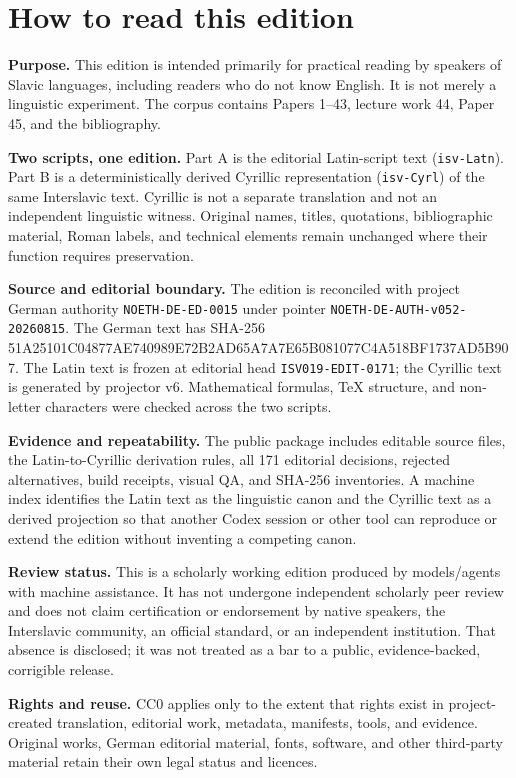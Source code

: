 \documentclass[11pt]{article}
\newcommand{\smallhash}[1]{{\ttfamily\footnotesize #1}}
\begin{document}
\section*{How to read this edition}

\textbf{Purpose.} This edition is intended primarily for practical reading by speakers of Slavic languages, including readers who do not know English. It is not merely a linguistic experiment. The corpus contains Papers 1--43, lecture work 44, Paper 45, and the bibliography.

\textbf{Two scripts, one edition.} Part A is the editorial Latin-script text (\texttt{isv-Latn}). Part B is a deterministically derived Cyrillic representation (\texttt{isv-Cyrl}) of the same Interslavic text. Cyrillic is not a separate translation and not an independent linguistic witness. Original names, titles, quotations, bibliographic material, Roman labels, and technical elements remain unchanged where their function requires preservation.

\textbf{Source and editorial boundary.} The edition is reconciled with project German authority \texttt{NOETH-DE-ED-0015} under pointer \texttt{NOETH-DE-AUTH-v052-20260815}. The German text has SHA-256
\smallhash{51A25101C04877AE740989E72B2AD65A7A7E65B081077C4A518BF1737AD5B907}.
The Latin text is frozen at editorial head \texttt{ISV019-EDIT-0171}; the Cyrillic text is generated by projector v6. Mathematical formulas, TeX structure, and non-letter characters were checked across the two scripts.

\textbf{Evidence and repeatability.} The public package includes editable source files, the Latin-to-Cyrillic derivation rules, all 171 editorial decisions, rejected alternatives, build receipts, visual QA, and SHA-256 inventories. A machine index identifies the Latin text as the linguistic canon and the Cyrillic text as a derived projection so that another Codex session or other tool can reproduce or extend the edition without inventing a competing canon.

\textbf{Review status.} This is a scholarly working edition produced by models/agents with machine assistance. It has not undergone independent scholarly peer review and does not claim certification or endorsement by native speakers, the Interslavic community, an official standard, or an independent institution. That absence is disclosed; it was not treated as a bar to a public, evidence-backed, corrigible release.

\textbf{Rights and reuse.} CC0 applies only to the extent that rights exist in project-created translation, editorial work, metadata, manifests, tools, and evidence. Original works, German editorial material, fonts, software, and other third-party material retain their own legal status and licences.
\end{document}
